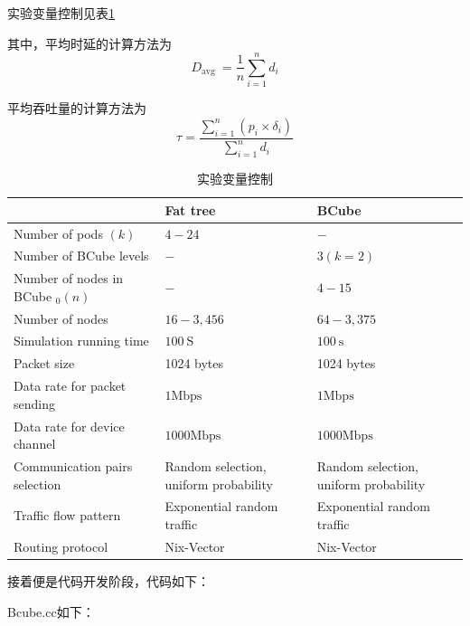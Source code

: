\documentclass[lang=cn,11pt,a4paper,cite=authoryear]{elegantpaper}
\begin{document}
实验变量控制见表\ref{table:bianliang}

其中，平均时延的计算方法为
$$
D_{\text {avg }}=\frac{1}{n} \sum_{i=1}^{n} d_{i}
$$


平均吞吐量的计算方法为
$$
\tau=\frac{\sum_{i=1}^{n}\left(p_{i} \times \delta_{i}\right)}{\sum_{i=1}^{n} d_{i}}
$$

\begin{table}[htbp]
	\centering
	\begin{tabular}{|l|l|l|}
		\hline & Fat tree & BCube \\
		\hline Number of pods $(k)$ & $4-24$ & $-$ \\
		\hline Number of BCube levels & $-$ & $3(k=2)$ \\
		\hline Number of nodes in BCube $_{0}(n)$ & $-$ & $4-15$ \\
		\hline Number of nodes & $16-3,456$ & $64-3,375$ \\
		\hline Simulation running time & $100 \mathrm{~S}$ & $100 \mathrm{~s}$ \\
		\hline Packet size & 1024 bytes & 1024 bytes \\
		\hline Data rate for packet sending & $1 \mathrm{Mbps}$ & $1 \mathrm{Mbps}$ \\
		\hline Data rate for device channel & $1000 \mathrm{Mbps}$ & $1000 \mathrm{Mbps}$ \\
		\hline Communication pairs selection & Random selection, uniform probability & Random selection, uniform probability \\
		\hline Traffic flow pattern & Exponential random traffic & Exponential random traffic \\
		\hline Routing protocol & Nix-Vector & Nix-Vector \\
		\hline
	\end{tabular}
	\caption{实验变量控制}
	\label{table:bianliang}
\end{table}


接着便是代码开发阶段，代码如下：

Bcube.cc如下：
\end{document}
